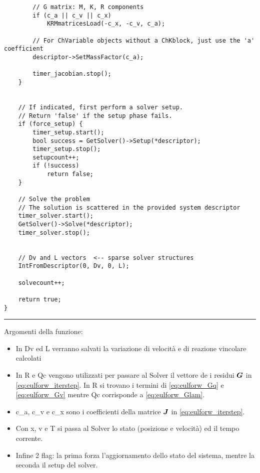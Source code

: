 \begin{verbatim}
        // G matrix: M, K, R components
        if (c_a || c_v || c_x)
            KRMmatricesLoad(-c_x, -c_v, c_a);

        // For ChVariable objects without a ChKblock, just use the 'a' coefficient
        descriptor->SetMassFactor(c_a);

        timer_jacobian.stop();
    }


    // If indicated, first perform a solver setup.
    // Return 'false' if the setup phase fails.
    if (force_setup) {
        timer_setup.start();
        bool success = GetSolver()->Setup(*descriptor);
        timer_setup.stop();
        setupcount++;
        if (!success)
            return false;
    }

    // Solve the problem
    // The solution is scattered in the provided system descriptor
    timer_solver.start();
    GetSolver()->Solve(*descriptor);
    timer_solver.stop();
    

    // Dv and L vectors  <-- sparse solver structures
    IntFromDescriptor(0, Dv, 0, L);

    solvecount++;

    return true;
}

\end{verbatim}
\noindent\rule{\textwidth}{1pt} \newline


Argomenti della funzione:
\begin{itemize}
    \item In Dv ed L verranno salvati la variazione di velocità e di reazione vincolare calcolati
    \item In R e Qc vengono utilizzati per passare al Solver il vettore de i residui ${\boldsymbol{G}}$ in \ref{eq:eulforw_iterstep}. In R si trovano i termini di  \ref{eq:eulforw_Gq} e \ref{eq:eulforw_Gv} mentre Qc corrisponde a  \ref{eq:eulforw_Glam}.
    \item c\_a, c\_v e c\_x sono i coefficienti della matrice ${\boldsymbol{J}}$ in \ref{eq:eulforw_iterstep}.
    \item Con x, v e T si passa al Solver lo stato (posizione e velocità) ed il tempo corrente.
    \item Infine 2 flag: la prima forza l'aggiornamento dello stato del sistema, mentre la seconda il setup del solver.
\end{itemize}

